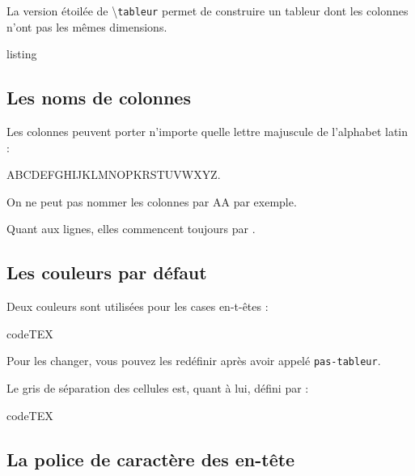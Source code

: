 \documentclass[a4paper,french]{article}
\begin{document}
La version \'etoil\'ee de \textbackslash\texttt{tableur} permet de construire un tableur dont les colonnes n'ont pas les m\^emes dimensions.


\begin{tcblisting}{listing}
\end{tcblisting}

\newpage

\subsection{Les noms de colonnes}

Les colonnes peuvent porter n'importe quelle lettre majuscule de l'alphabet latin :

ABCDEFGHIJKLMNOPKRSTUVWXYZ.

On ne peut pas nommer les colonnes par \og AA \fg{} par exemple.

\medskip

Quant aux lignes, elles commencent toujours par  \fg.


\subsection{Les couleurs par d\'efaut}

Deux couleurs sont utilis\'ees pour les cases \og en-t-\^etes \fg{} :

\medskip

\begin{tcblisting}{codeTEX}
\end{tcblisting}

\medskip

Pour les changer, vous pouvez les red\'efinir apr\`es avoir appel\'e \texttt{pas-tableur}.

\medskip

Le gris de s\'eparation des cellules est, quant \`a lui, d\'efini par :

\medskip

\begin{tcblisting}{codeTEX}
\end{tcblisting}

\subsection{La police de caract\`ere des en-t\^ete}
\end{document}
